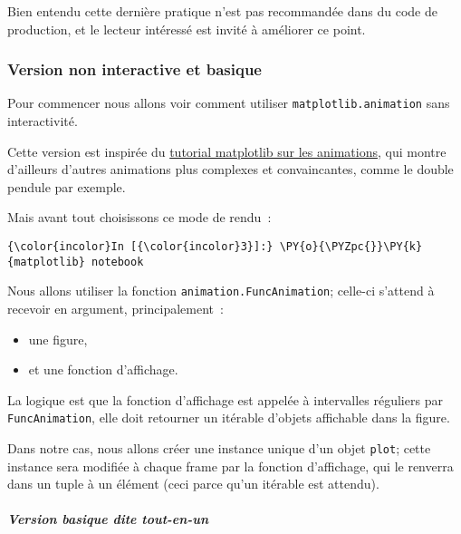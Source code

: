 Bien entendu cette dernière pratique n'est pas recommandée dans du code
de production, et le lecteur intéressé est invité à améliorer ce point.

    \hypertarget{version-non-interactive-et-basique}{%
\subsubsection{Version non interactive et
basique}\label{version-non-interactive-et-basique}}

    Pour commencer nous allons voir comment utiliser
\texttt{matplotlib.animation} sans interactivité.

Cette version est inspirée du
\href{https://jakevdp.github.io/blog/2012/08/18/matplotlib-animation-tutorial/}{tutorial
matplotlib sur les animations}, qui montre d'ailleurs d'autres
animations plus complexes et convaincantes, comme le double pendule par
exemple.

    Mais avant tout choisissons ce mode de rendu~:

    \begin{Verbatim}[commandchars=\\\{\},frame=single,framerule=0.3mm,rulecolor=\color{cellframecolor}]
{\color{incolor}In [{\color{incolor}3}]:} \PY{o}{\PYZpc{}}\PY{k}{matplotlib} notebook
\end{Verbatim}


    Nous allons utiliser la fonction \texttt{animation.FuncAnimation};
celle-ci s'attend à recevoir en argument, principalement~:

\begin{itemize}
\tightlist
\item
  une figure,
\item
  et une fonction d'affichage.
\end{itemize}

La logique est que la fonction d'affichage est appelée à intervalles
réguliers par \texttt{FuncAnimation}, elle doit retourner un itérable
d'objets affichable dans la figure.

Dans notre cas, nous allons créer une instance unique d'un objet
\texttt{plot}; cette instance sera modifiée à chaque frame par la
fonction d'affichage, qui le renverra dans un tuple à un élément (ceci
parce qu'un itérable est attendu).

    \hypertarget{version-basique-dite-tout-en-un}{%
\subparagraph{\texorpdfstring{Version basique dite
\emph{tout-en-un}}{Version basique dite tout-en-un}}\label{version-basique-dite-tout-en-un}}

